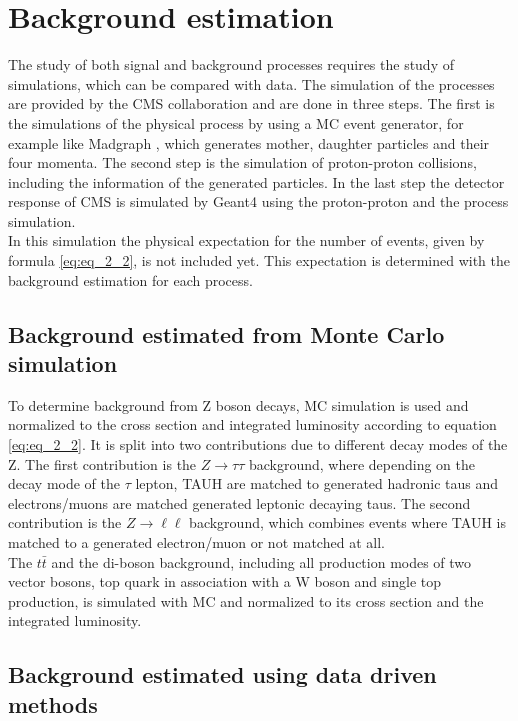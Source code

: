 \section{Background estimation}

The study of both signal and background processes requires the study of simulations, which can be compared with data. The simulation of the processes are provided by the \gls{CMS} collaboration and are done in three steps. The first is the simulations of the physical process by using a \gls{MC} event generator, for example like Madgraph \cite{MADGRAPH}, which generates mother, daughter particles and their four momenta. The second step is the simulation of proton-proton collisions, including the information of the generated particles. In the last step the detector response of \gls{CMS} is simulated by Geant4 \cite{GEANT4} using the proton-proton and the process simulation. \\

In this simulation the physical expectation for the number of events, given by formula \ref{eq:eq_2_2}, is not included yet. This expectation is determined with the background estimation for each process.

\subsection{Background estimated from Monte Carlo simulation}
\label{sec:section_3_4_1}

To determine background from Z boson decays, \gls{MC} simulation is used and normalized to the cross section and integrated luminosity according to equation \ref{eq:eq_2_2}. It is split into two contributions due to different decay modes of the Z. The first contribution is the $Z\to\tau\tau$ background, where depending on the decay mode of the $\tau$ lepton, \gls{TAUH} are matched to generated hadronic taus and electrons/muons are matched generated leptonic decaying taus. The second contribution is the $Z\to\ell\ell$ background, which combines events where \gls{TAUH} is matched to a generated electron/muon or not matched at all. \\ 

The $t\bar{t}$ and the di-boson background, including all production modes of two vector bosons, top quark in association with a W boson and single top production, is simulated with \gls{MC} and normalized to its cross section and the integrated luminosity. 


\subsection{Background estimated using data driven methods}
\label{sec:section_3_4_2}

